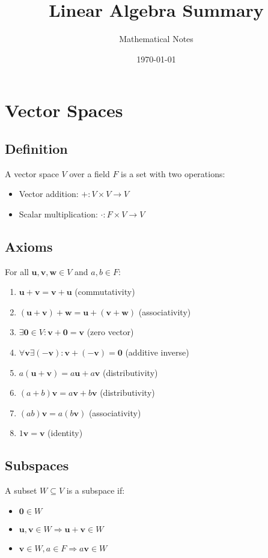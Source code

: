 \documentclass[11pt]{article}
\title{Linear Algebra Summary}
\author{Mathematical Notes}
\date{\today}
\begin{document}
\maketitle

\tableofcontents
\newpage

\section{Vector Spaces}

\subsection{Definition}
A vector space $V$ over a field $F$ is a set with two operations:
\begin{itemize}
    \item Vector addition: $+ : V \times V \to V$
    \item Scalar multiplication: $\cdot : F \times V \to V$
\end{itemize}

\subsection{Axioms}
For all $\mathbf{u}, \mathbf{v}, \mathbf{w} \in V$ and $a, b \in F$:
\begin{enumerate}
    \item $\mathbf{u} + \mathbf{v} = \mathbf{v} + \mathbf{u}$ (commutativity)
    \item $(\mathbf{u} + \mathbf{v}) + \mathbf{w} = \mathbf{u} + (\mathbf{v} + \mathbf{w})$ (associativity)
    \item $\exists \mathbf{0} \in V : \mathbf{v} + \mathbf{0} = \mathbf{v}$ (zero vector)
    \item $\forall \mathbf{v} \exists (-\mathbf{v}) : \mathbf{v} + (-\mathbf{v}) = \mathbf{0}$ (additive inverse)
    \item $a(\mathbf{u} + \mathbf{v}) = a\mathbf{u} + a\mathbf{v}$ (distributivity)
    \item $(a + b)\mathbf{v} = a\mathbf{v} + b\mathbf{v}$ (distributivity)
    \item $(ab)\mathbf{v} = a(b\mathbf{v})$ (associativity)
    \item $1\mathbf{v} = \mathbf{v}$ (identity)
\end{enumerate}

\subsection{Subspaces}
A subset $W \subseteq V$ is a subspace if:
\begin{itemize}
    \item $\mathbf{0} \in W$
    \item $\mathbf{u}, \mathbf{v} \in W \Rightarrow \mathbf{u} + \mathbf{v} \in W$
    \item $\mathbf{v} \in W, a \in F \Rightarrow a\mathbf{v} \in W$
\end{itemize}
\end{document}
